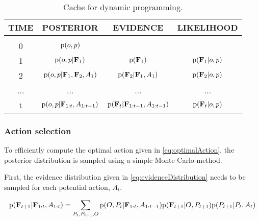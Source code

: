             \setlength{\tabcolsep}{.25em}
            \begin{table}[h]
                \caption{Cache for dynamic programming.}
                \label{tab:dynamicProgramming}
                \begin{center}
                \begin{tabular}{cccc} %
                    {\bf TIME} & {\bf POSTERIOR} & {\bf EVIDENCE} & {\bf LIKELIHOOD}
                    \\ \hline \\
                    0 & $\text{p}(o,p)$ & & \\[0.5em]
                    1 & $\text{p}(o,p|\mathbf{F}_1)$ & $\text{p}(\mathbf{F}_1)$ & $\text{p}(\mathbf{F}_1|o,p)$ \\[0.5em]
                    2 & $\text{p}(o,p|\mathbf{F}_1,\mathbf{F}_2,A_1)$ & $\text{p}(\mathbf{F}_2|\mathbf{F}_1,A_1)$ & $\text{p}(\mathbf{F}_2|o,p)$ \\[0.5em]
                    ...&...&...&...\\[0.5em]
                    t & $\text{p}(o,p|\mathbf{F}_{1:t},A_{1:t-1})$ & $\text{p}(\mathbf{F}_t|\mathbf{F}_{1:t-1},A_{1:t-1})$ & $\text{p}(\mathbf{F}_t|o,p)$ \\
                \end{tabular}
                \end{center}
            \end{table}

            \subsubsection{Action selection}

                To efficiently compute the optimal action given in \eqref{eq:optimalAction}, the posterior distribution is sampled using a simple Monte Carlo method. 

                First, the evidence distribution given in \eqref{eq:evidenceDistribution} needs to be sampled for each potential action, $A_{t}$.

                \begin{equation}
                    \label{eq:evidenceDistribution}
                    \text{p}(\mathbf{F}_{t+1}|\mathbf{F}_{1:t}, A_{1:t}) = \sum_{P_t,P_{t+1},O} \text{p}(O,P_t|\mathbf{F}_{1:t},A_{1:t-1}) \text{p}(\mathbf{F}_{t+1}|O,P_{t+1}) \text{p}(P_{t+1}|P_t,A_t)
                \end{equation}

